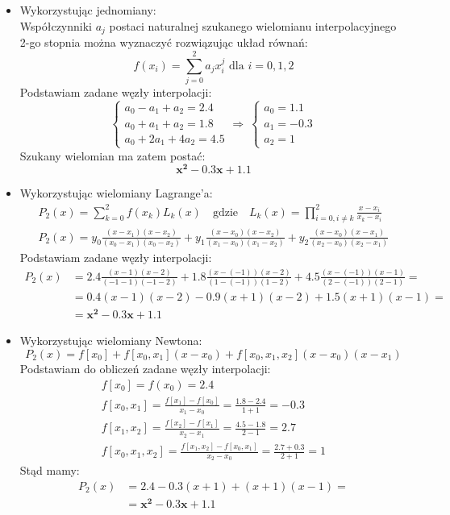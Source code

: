 \documentclass{article}
\begin{document}
\subsection{}
\begin{itemize}
    \item Wykorzystując jednomiany:\\
    Współczynniki \(a_j\) postaci naturalnej szukanego wielomianu interpolacyjnego 2-go stopnia można wyznaczyć rozwiązując układ równań:
    \[f(x_i) = \sum_{j=0}^2 a_j x_i^j \text{ dla } i = 0, 1, 2\]
    Podstawiam zadane węzły interpolacji:
    \[\left\{
    \begin{array}{l}
         a_0 - a_1 + a_2 = 2.4\\
         a_0 + a_1 + a_2 = 1.8\\
         a_0 + 2a_1 + 4a_2 = 4.5
    \end{array}
    \right.
    \Rightarrow\ 
    \left\{
    \begin{array}{l}
         a_0 = 1.1\\
         a_1 = -0.3\\
         a_2 = 1
    \end{array}
    \right.\]
    Szukany wielomian ma zatem postać:
    \[\boldsymbol{x^2 - 0.3x + 1.1}\]
    \item Wykorzystując wielomiany Lagrange’a:
    \begin{gather*}
        P_2(x) = \sum_{k=0}^2 f(x_k) L_k(x) \quad \text{gdzie} \quad L_k(x) = \prod_{i = 0, i \neq k}^2 \frac{x - x_i}{x_k - x_i}\\
        P_2(x) = y_0 \frac{(x-x_1)(x-x_2)}{(x_0-x_1)(x_0-x_2)} + y_1 \frac{(x-x_0)(x-x_2)}{(x_1-x_0)(x_1-x_2)} + y_2 \frac{(x-x_0)(x-x_1)}{(x_2-x_0)(x_2-x_1)}
    \end{gather*}
    Podstawiam zadane węzły interpolacji:
    \begin{align*}
        P_2(x) &= 2.4 \frac{(x-1)(x-2)}{(-1-1)(-1-2)} + 1.8 \frac{(x-(-1))(x-2)}{(1-(-1))(1-2)} + 4.5 \frac{(x-(-1))(x-1)}{(2-(-1))(2-1)} =\\
        &= 0.4(x-1)(x-2) -0.9(x+1)(x-2) + 1.5(x+1)(x-1) =\\
        &= \boldsymbol{x^2 - 0.3x + 1.1}
    \end{align*}
    \item Wykorzystując wielomiany Newtona:
    \[P_2(x) = f[x_0] + f[x_0, x_1](x-x_0) + f[x_0,x_1,x_2](x-x_0)(x-x_1)\]
    Podstawiam do obliczeń zadane węzły interpolacji:
    \begin{gather*}
        f[x_0] = f(x_0) = 2.4\\
        f[x_0, x_1] = \frac{f[x_1] - f[x_0]}{x_1 - x_0} = \frac{1.8 - 2.4}{1 + 1} = -0.3\\
        f[x_1, x_2] = \frac{f[x_2] - f[x_1]}{x_2 - x_1} = \frac{4.5 - 1.8}{2 - 1} = 2.7\\
        f[x_0, x_1, x_2] = \frac{f[x_1, x_2] - f[x_0, x_1]}{x_2 - x_0} = \frac{2.7 + 0.3}{2 + 1} = 1
    \end{gather*}
    Stąd mamy:
    \begin{align*}
        P_2(x) &= 2.4 - 0.3(x+1) + (x+1)(x-1) =\\
        &= \boldsymbol{x^2 - 0.3x + 1.1}
    \end{align*}
\end{itemize}
\end{document}
